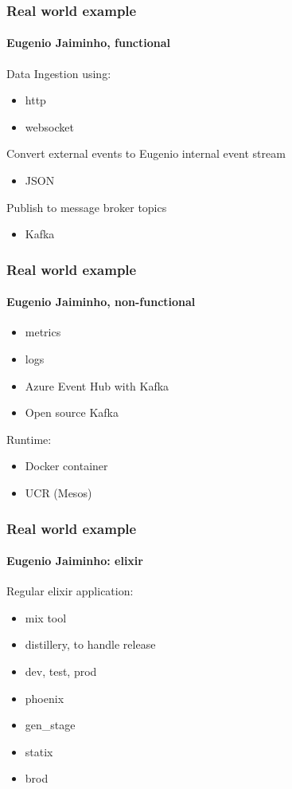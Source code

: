 \documentclass{beamer}
\begin{document}
  \begin{frame}
    \frametitle{Real world example}
    \framesubtitle{Eugenio Jaiminho, functional}
  
  Data Ingestion using:
  \begin{itemize}
    \item http
    \item websocket
  \end{itemize}
  
  Convert external events to Eugenio internal event stream
  \begin{itemize}
    \item JSON
  \end{itemize}
  
  Publish to message broker topics
  \begin{itemize}
    \item Kafka
  \end{itemize}
  
  
  
  \end{frame}
  
  
  \begin{frame}
    \frametitle{Real world example}
    \framesubtitle{Eugenio Jaiminho, non-functional}
     
    \begin{itemize}
      \item metrics
      \item logs
      \item Azure Event Hub with Kafka
      \item Open source Kafka
    \end{itemize}
   
    Runtime:
    \begin{itemize}
      \item Docker container
      \item UCR (Mesos)
    \end{itemize}
   
  \end{frame}
  
  
  \begin{frame}
    \frametitle{Real world example}
    \framesubtitle{Eugenio Jaiminho: elixir}
    
    Regular elixir application:
    \begin{itemize}
      \item mix tool
      \item distillery, to handle release
      \item dev, test, prod
      \item phoenix
      \item gen\_stage
      \item statix
      \item brod
    \end{itemize}

  \end{frame}
  
\end{document}
